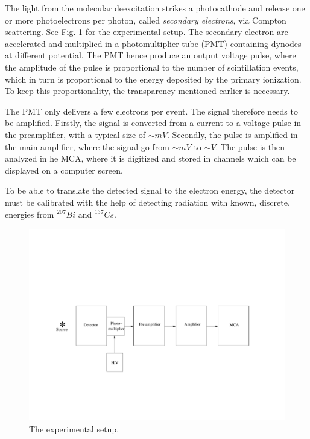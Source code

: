 \documentclass[a4,11pt, notitlepage]{article}
\begin{document}
The light from the molecular deexcitation strikes a photocathode and release one or more photoelectrons per photon, called \textit{secondary electrons}, via Compton scattering. See Fig. \ref{fig:setup} for the experimental setup. The secondary electron are accelerated and multiplied in a photomultiplier tube (PMT) containing dynodes at different potential. The PMT hence produce an output voltage pulse, where the amplitude of the pulse is proportional to the number of scintillation events, which in turn is proportional to the energy deposited by the primary ionization. To keep this proportionality, the transparency mentioned earlier is necessary.  

The PMT only delivers a few electrons per event. The signal therefore needs to be amplified. Firstly, the signal is converted from a current to a voltage pulse in the preamplifier, with a typical size of $\sim mV$. Secondly, the pulse is amplified in the main amplifier, where the signal go from $\sim mV$ to $\sim V$. The pulse is then analyzed in he MCA, where it is digitized and stored in channels which can be displayed on a computer screen. 

To be able to translate the detected signal to the electron energy, the detector must be calibrated with the help of detecting radiation with known, discrete, energies from $^{207}Bi$ and $^{137}Cs$.  

\begin{figure}[htp]
  \vspace{40pt}
  \begin{center}
    \includegraphics[width=15.0cm]{figures/Setup.png}
    \caption{The experimental setup.}
\label{fig:setup}
  \end{center}
\end{figure}
\end{document}
